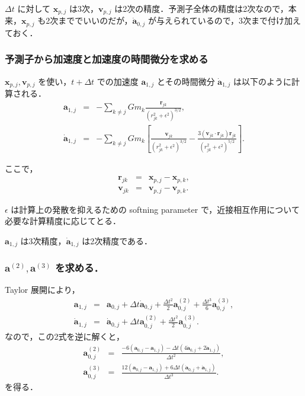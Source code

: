 \documentclass[11pt,a4paper,oneside,onecolumn]{jreport}
\begin{document}
$\Delta t$ に対して ${\bm x}_{p,j}$ は3次，${\bm v}_{p,j}$ は2次の精度．予測子全体の精度は2次なので，本来，${\bm x}_{p,j}$ も2次まででいいのだが，$\dot{{\bm a}}_{0,j}$ が与えられているので，3次まで付け加えておく．

\subsubsection{予測子から加速度と加速度の時間微分を求める}
${\bm x}_{p,j}, {\bm v}_{p,j}$ を使い，$t + \Delta t$ での加速度 ${\bm a}_{1,j}$ とその時間微分 $\dot{{\bm a}}_{1,j}$ は以下のように計算される．
\begin{eqnarray}
{\bm a}_{1,j} & = & - \sum_{k \not= j} G m_k \frac{{\bm r}_{jk}}{(r_{jk}^2 + \epsilon^2)^{3/2}}, \label{eq:a1j}\\
\dot{{\bm a}}_{1,j} & = & - \sum_{k \not= j} G m_k \left[ \frac{{\bm v}_{jk}}{(r_{jk}^2 + \epsilon^2)^{3/2}} - \frac{3 ( {\bm v}_{jk} \cdot {\bm r}_{jk} ) {\bm r}_{jk} }{(r_{jk}^2 + \epsilon^2)^{5/2}} \right]. \label{eq:a2j}
\end{eqnarray}

ここで，
\begin{eqnarray}
{\bm r}_{jk} & = & {\bm x}_{p,j} - {\bm x}_{p,k}, \\
{\bm v}_{jk} & = & {\bm v}_{p,j} - {\bm v}_{p,k}. 
\end{eqnarray}

$\epsilon$ は計算上の発散を抑えるための softning parameter で，近接相互作用について必要な計算精度に応じてとる．

${\bm a}_{1,j}$ は3次精度，$\dot{{\bm a}}_{1,j}$ は2次精度である．

\subsubsection{${\bm a}^{(2)}, {\bm a}^{(3)}$ を求める．\label{sec:corrector}}
Taylor 展開により，
\begin{eqnarray}
{\bm a}_{1,j} & = & {\bm a}_{0,j} + \Delta t \dot{{\bm a}}_{0,j} + \frac{\Delta t ^2}{2} {\bm a}_{0,j}^{(2)} + \frac{\Delta t ^3}{6} {\bm a}_{0,j}^{(3)}, \\
\dot{{\bm a}}_{1,j} & = & \dot{{\bm a}}_{0,j} + \Delta t {\bm a}_{0,j}^{(2)} + \frac{\Delta t ^2}{2} {\bm a}_{0,j}^{(3)}. 
\end{eqnarray}
なので，この2式を逆に解くと，
\begin{eqnarray}
{\bm a}_{0,j}^{(2)} & = & \frac{- 6 ({\bm a}_{0,j} - {\bm a}_{1,j}) - \Delta t (4 \dot{{\bm a}}_{0,j} + 2 \dot{{\bm a}}_{1,j})}{\Delta t ^2}, \\
{\bm a}_{0,j}^{(3)} & = & \frac{12 ({\bm a}_{0,j} - {\bm a}_{1,j}) + 6 \Delta t (\dot{{\bm a}}_{0,j} + \dot{{\bm a}}_{1,j})}{\Delta t ^3}. 
\end{eqnarray}
を得る．
\end{document}
